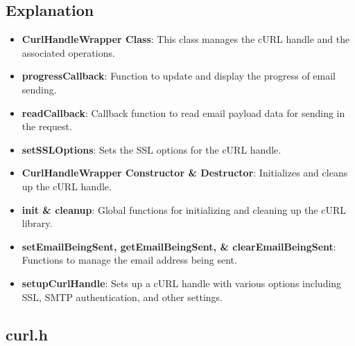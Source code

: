 \documentclass{article}
\begin{document}
	\subsection*{Explanation}
	\begin{itemize}
		\item \textbf{CurlHandleWrapper Class}: This class manages the cURL handle and the associated operations.
		\item \textbf{progressCallback}: Function to update and display the progress of email sending.
		\item \textbf{readCallback}: Callback function to read email payload data for sending in the request.
		\item \textbf{setSSLOptions}: Sets the SSL options for the cURL handle.
		\item \textbf{CurlHandleWrapper Constructor \& Destructor}: Initializes and cleans up the cURL handle.
		\item \textbf{init \& cleanup}: Global functions for initializing and cleaning up the cURL library.
		\item \textbf{setEmailBeingSent, getEmailBeingSent, \& clearEmailBeingSent}: Functions to manage the email address being sent.
		\item \textbf{setupCurlHandle}: Sets up a cURL handle with various options including SSL, SMTP authentication, and other settings.
	\end{itemize}
	\subsection{curl.h}
	
\end{document}
